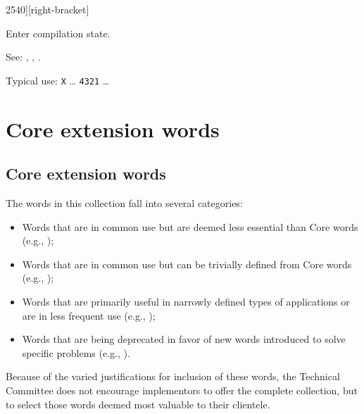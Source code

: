\begin{newword}{2540}{]}[right-bracket]
	\stack{}{}

	Enter compilation state.

\item[See:]
	,
	,
	\wref{core:[}{[}.

	\begin{rationale} %
		Typical use:
			\word{:} \texttt{X} {\ldots}
				\word{[} \texttt{4321} \word{]} 
			{\ldots} \word{;}
	\end{rationale}
\end{newword}


\section{Core extension words} %
\extended

\begin{info}

\subsection{Core extension words} %

The words in this collection fall into several categories:

\begin{itemize}
\item Words that are in common use but are deemed less essential than
	Core words (e.g., );

\item Words that are in common use but can be trivially defined from
	Core words (e.g., );

\item Words that are primarily useful in narrowly defined types of
	applications or are in less frequent use (e.g., );

\item Words that are being deprecated in favor of new words introduced
	to solve specific problems (e.g., ).
\end{itemize}

Because of the varied justifications for inclusion of these words,
the Technical Committee does not encourage implementors to offer the
complete collection, but to select those words deemed most valuable to
their clientele.
\end{info}


